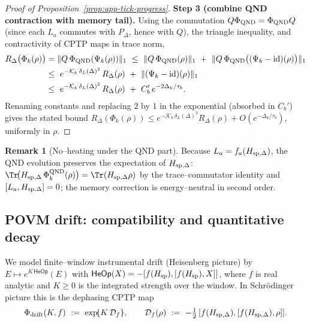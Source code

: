 \documentclass[10pt]{article}
\theoremstyle{definition}
\newtheorem{remark}{Remark}[section]
\theoremstyle{plain}
\begin{document}
\begin{proof}[Proof of Proposition~\ref{prop:app-tick-progress}]
\smallskip
\textbf{Step 3 (combine QND contraction with memory tail).}
Using the commutation \(Q\Phi_{\rm QND}=\Phi_{\rm QND}Q\) (since each \(L_a\) commutes with \(P_\Delta\), hence with \(Q\)), the triangle inequality, and contractivity of CPTP maps in trace norm,
\begin{align*}
R_\Delta\big(\Phi_k(\rho)\big)
&=\|Q\,\Phi_{\rm QND}(\Psi_k(\rho))\|_1
\ \le\ \|Q\,\Phi_{\rm QND}(\rho)\|_1\ +\ \|Q\,\Phi_{\rm QND}\big((\Psi_k-\mathrm{id})(\rho)\big)\|_1 \\
&\le\ e^{-\mathcal K_k\,\delta_L(\Delta)^2}\,R_\Delta(\rho)\ +\ \|(\Psi_k-\mathrm{id})(\rho)\|_1 \\
&\le\ e^{-\mathcal K_k\,\delta_L(\Delta)^2}\,R_\Delta(\rho)\ +\ C_b'\,e^{-2\Delta_k/\tau_b}.
\end{align*}
Renaming constants and replacing \(2\) by \(1\) in the exponential (absorbed in \(C_b'\)) gives the stated bound
\(
R_\Delta(\Phi_k(\rho))\le e^{-\mathcal K_k\,\delta_L(\Delta)^2}R_\Delta(\rho)+O(e^{-\Delta_k/\tau_b})
\),
uniformly in \(\rho\).
\end{proof}

\begin{remark}[No–heating under the QND part]
\label{rem:uom-main-010}
Because \(L_a=f_a(H_{{\rm sp},\Delta})\), the QND evolution preserves the expectation of \(H_{{\rm sp},\Delta}\):
\(
\Tr\!\big(H_{{\rm sp},\Delta}\,\Phi^{\rm QND}_k(\rho)\big)=\Tr(H_{{\rm sp},\Delta}\rho)
\)
by the trace–commutator identity and \([L_a,H_{{\rm sp},\Delta}]=0\); the memory correction is energy–neutral in second order.
\end{remark}

\medskip

\subsection*{POVM drift: compatibility and quantitative decay}\label{subsec:uom-main-006}

We model finite–window instrumental drift (Heisenberg picture) by
\(
E\mapsto e^{K\,\mathsf{HeOp}}(E)
\)
with
\(
\mathsf{HeOp}(X)=-[f(H_{{\rm sp}}),[f(H_{{\rm sp}}),X]]
\),
where \(f\) is real analytic and \(K\ge 0\) is the integrated strength over the window.
In Schrödinger picture this is the dephasing CPTP map
\[
\Phi_{\rm drift}(K,f)\ :=\ \exp\!\{K\,\mathcal D_f\},
\qquad
\mathcal D_f(\rho)\ :=\ -\tfrac12\,[f(H_{{\rm sp},\Delta}),[f(H_{{\rm sp},\Delta}),\rho]].
\]
\end{document}
